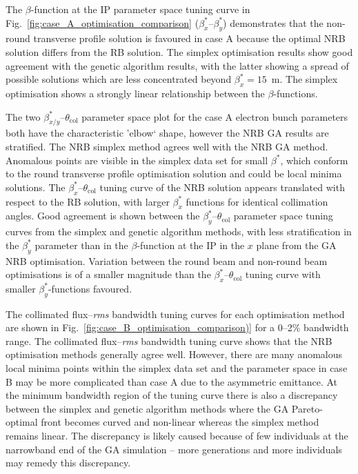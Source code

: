 \documentclass[../main.tex]{subfiles}
\begin{document}
The $\beta$-function at the IP parameter space tuning curve in Fig.~\ref{fig:case_A_optimisation_comparison} ($\beta_{x}^{*}$--$\beta_{y}^{*}$) demonstrates that the non-round transverse profile solution is favoured in case A because the optimal NRB solution differs from the RB solution. The simplex optimisation results show good agreement with the genetic algorithm results, with the latter showing a spread of possible solutions which are less concentrated beyond $\beta_{x}^{*} = 15$~\si{\meter}. The simplex optimisation shows a strongly linear relationship between the $\beta$-functions. 

The two $\beta_{x/y}^{*}$--$\theta_{\mathrm{col}}$ parameter space plot for the case A electron bunch parameters both have the characteristic 'elbow` shape, however the NRB GA results are stratified. The NRB simplex method agrees well with the NRB GA method. Anomalous points are visible in the simplex data set for small $\beta^{*}$, which conform to the round transverse profile optimisation solution and could be local minima solutions. The $\beta_{x}^{*}$--$\theta_{\mathrm{col}}$ tuning curve of the NRB solution appears translated with respect to the RB solution, with larger $\beta_{x}^{*}$ functions for identical collimation angles. Good agreement is shown between the $\beta_{y}^{*}$--$\theta_{\mathrm{col}}$ parameter space tuning curves from the simplex and genetic algorithm methods, with less stratification in the $\beta_{y}^{*}$ parameter than in the $\beta$-function at the IP in the $x$ plane from the GA NRB optimisation. Variation between the round beam and non-round beam optimisations is of a smaller magnitude than the $\beta_{x}^{*}$--$\theta_{\mathrm{col}}$ tuning curve with smaller $\beta_{y}^{*}$-functions favoured.   


The collimated flux--\textit{rms} bandwidth tuning curves for each optimisation method are shown in Fig.~\ref{fig:case_B_optimisation_comparison)} for a 0--2\% bandwidth range. The collimated flux--\textit{rms} bandwidth tuning curve shows that the NRB optimisation methods generally agree well. However, there are many anomalous local minima points within the simplex data set and the parameter space in case B may be more complicated than case A due to the asymmetric emittance. At the minimum bandwidth region of the tuning curve there is also a discrepancy between the simplex and genetic algorithm methods where the GA Pareto-optimal front becomes curved and non-linear whereas the simplex method remains linear. The discrepancy is likely caused because of few individuals at the narrowband end of the GA simulation -- more generations and more individuals may remedy this discrepancy.
\end{document}
